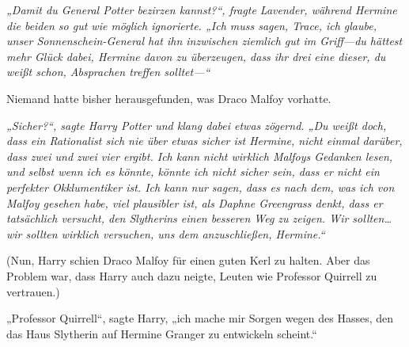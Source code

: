 \emph{„Damit du General Potter bezirzen kannst?“, fragte Lavender, während Hermine die beiden so gut wie möglich ignorierte. „Ich muss sagen, Trace, ich glaube, unser Sonnenschein-General hat ihn inzwischen ziemlich gut im Griff—du hättest mehr Glück dabei, Hermine davon zu überzeugen, dass ihr drei eine dieser, du weißt schon, Absprachen treffen solltet—“}

Niemand hatte bisher herausgefunden, was Draco Malfoy vorhatte.

\emph{„Sicher?“, sagte Harry Potter und klang dabei etwas zögernd. „Du weißt doch, dass ein Rationalist sich nie über etwas sicher ist Hermine, nicht einmal darüber, dass zwei und zwei vier ergibt. Ich kann nicht wirklich Malfoys Gedanken lesen, und selbst wenn ich es könnte, könnte ich nicht sicher sein, dass er nicht ein perfekter Okklumentiker ist. Ich kann nur sagen, dass es nach dem, was ich von Malfoy gesehen habe, viel plausibler ist, als Daphne Greengrass denkt, dass er tatsächlich versucht, den Slytherins einen besseren Weg zu zeigen. Wir sollten…wir sollten wirklich versuchen, uns dem anzuschließen, Hermine.“}

(Nun, Harry schien Draco Malfoy für einen guten Kerl zu halten. Aber das Problem war, dass Harry auch dazu neigte, Leuten wie Professor Quirrell zu vertrauen.)

\later

„Professor Quirrell“, sagte Harry, „ich mache mir Sorgen wegen des Hasses, den das Haus Slytherin auf Hermine Granger zu entwickeln scheint.“

